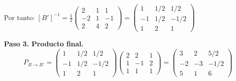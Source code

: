 \begin{prob}
\begin{myproof}
Por tanto: $[B']^{-1} = \frac{1}{2}\begin{pmatrix}2&1&1\\-2&1&-1\\2&4&2\end{pmatrix} = \begin{pmatrix}1&1/2&1/2\\-1&1/2&-1/2\\1&2&1\end{pmatrix}$

\textbf{Paso 3. Producto final.}
$$P_{B\to B'} = \begin{pmatrix}1&1/2&1/2\\-1&1/2&-1/2\\1&2&1\end{pmatrix}\begin{pmatrix}2&2&1\\1&-1&2\\1&1&1\end{pmatrix} = \boxed{\begin{pmatrix}3&2&5/2\\-2&-3&-1/2\\5&1&6\end{pmatrix}}$$
\end{myproof}
\end{prob}

